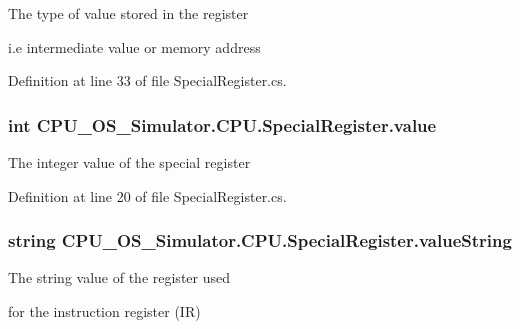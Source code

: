 The type of value stored in the register 

i.\+e intermediate value or memory address 

Definition at line 33 of file Special\+Register.\+cs.

\hypertarget{class_c_p_u___o_s___simulator_1_1_c_p_u_1_1_special_register_a040dbed0c42c3a45ccb7b01d181dd829}{}
\subsubsection[{value}]{\setlength{\rightskip}{0pt plus 5cm}int C\+P\+U\+\_\+\+O\+S\+\_\+\+Simulator.\+C\+P\+U.\+Special\+Register.\+value\hspace{0.3cm}{\ttfamily [private]}}\label{class_c_p_u___o_s___simulator_1_1_c_p_u_1_1_special_register_a040dbed0c42c3a45ccb7b01d181dd829}


The integer value of the special register 



Definition at line 20 of file Special\+Register.\+cs.

\hypertarget{class_c_p_u___o_s___simulator_1_1_c_p_u_1_1_special_register_a540a55b17a53591312e76689d051abac}{}
\subsubsection[{value\+String}]{\setlength{\rightskip}{0pt plus 5cm}string C\+P\+U\+\_\+\+O\+S\+\_\+\+Simulator.\+C\+P\+U.\+Special\+Register.\+value\+String\hspace{0.3cm}{\ttfamily [private]}}\label{class_c_p_u___o_s___simulator_1_1_c_p_u_1_1_special_register_a540a55b17a53591312e76689d051abac}




The string value of the register used 

for the instruction register (I\+R) 

